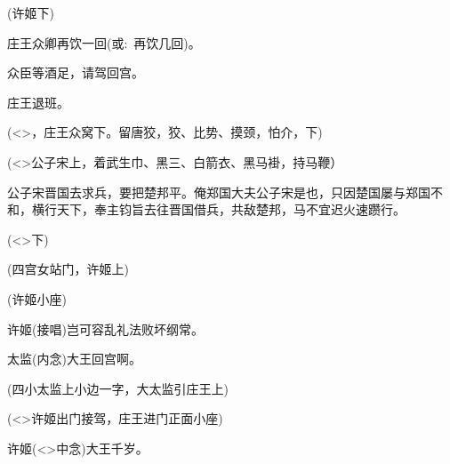{(许姬{\hwfs 下})

庄王\hspace{30pt}众卿再饮一回({\akai 或}:~再饮几回)。

众\hspace{40pt}臣等酒足，请驾回宫。

庄王\hspace{30pt}退班。

(\textless{}\!\textgreater{}，庄王众{\hwfs 窝下}。{\hwfs 留}唐狡，狡、{\hwfs 比势}、{\hwfs 摸颈}，{\hwfs 怕介}，{\hwfs 下})

\vspace{5pt}

(\textless{}\!\textgreater{}公子宋{\hwfs 上}，{\hwfs 着}武生巾、黑三、白箭衣、黑马褂，持马鞭）

公子宋\hspace{20pt}晋国去求兵，要把楚邦平。俺郑国大夫公子宋是也，只因楚国屡与郑国不和，横行天下，奉主钧旨去往晋国借兵，共敌楚邦，马不宜迟火速躜行。

(\textless{}\!\textgreater{}{\hwfs 下})

\vspace{5pt}

({\hwfs 四}宫女{\hwfs 站门}，许姬{\hwfs 上})


(许姬{\hwfs 小座})

许姬\hspace{30pt}({\akai 接唱})岂可容乱礼法败坏纲常。

太监\hspace{30pt}({\akai 内念})大王回宫啊。

({\hwfs 四}小太监{\hwfs 上小边一字}，大太监{\hwfs 引}庄王{\hwfs 上})


(\textless{}\!\textgreater{}许姬{\hwfs 出门接驾}，庄王{\hwfs 进门正面小座})

许姬\hspace{30pt}(\textless{}\!\textgreater{}{\hwfs 中}{\akai 念})大王千岁。

}
